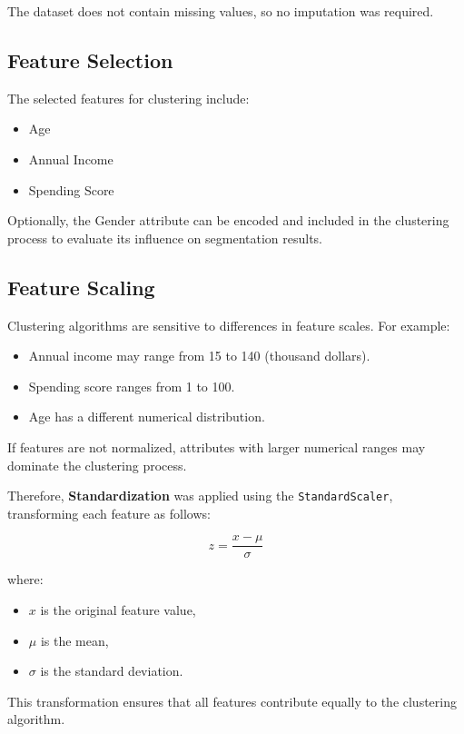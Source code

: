 \documentclass[12pt,a4paper]{article}
\begin{document}
The dataset does not contain missing values, so no imputation was required.

\subsection{Feature Selection}

The selected features for clustering include:

\begin{itemize}
    \item Age
    \item Annual Income
    \item Spending Score
\end{itemize}

Optionally, the Gender attribute can be encoded and included in the clustering process to evaluate its influence on segmentation results.

\subsection{Feature Scaling}

Clustering algorithms are sensitive to differences in feature scales. For example:

\begin{itemize}
    \item Annual income may range from 15 to 140 (thousand dollars).
    \item Spending score ranges from 1 to 100.
    \item Age has a different numerical distribution.
\end{itemize}

If features are not normalized, attributes with larger numerical ranges may dominate the clustering process.

Therefore, \textbf{Standardization} was applied using the \texttt{StandardScaler}, transforming each feature as follows:

\[
z = \frac{x - \mu}{\sigma}
\]

where:
\begin{itemize}
    \item $x$ is the original feature value,
    \item $\mu$ is the mean,
    \item $\sigma$ is the standard deviation.
\end{itemize}

This transformation ensures that all features contribute equally to the clustering algorithm.
\end{document}

